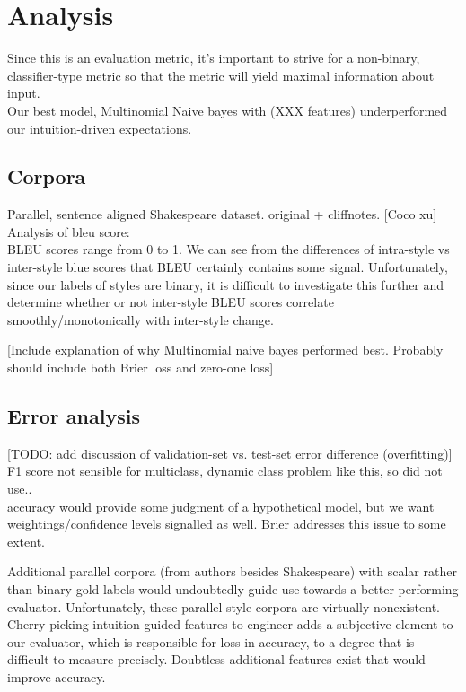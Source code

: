 \documentclass[letterpaper, 10 pt, conference]{ieeeconf}  %
\begin{document}
  \section{Analysis}
    Since this is an evaluation metric, it's important to strive for a non-binary, classifier-type metric so that the metric will yield maximal information about input.\\
    Our best model, Multinomial Naive bayes with (XXX features) underperformed our intuition-driven expectations.

  \subsection{Corpora}
    Parallel, sentence aligned Shakespeare dataset. original + cliffnotes. [Coco xu]
    Analysis of bleu score:\\


  BLEU scores range from 0 to 1. We can see from the differences of intra-style vs inter-style blue scores that BLEU certainly contains some signal. Unfortunately, since our labels of styles are binary, it is difficult to investigate this further and determine whether or not inter-style BLEU scores correlate smoothly/monotonically with inter-style change.

  [Include explanation of why Multinomial naive bayes performed best. Probably should include both Brier loss and zero-one loss]

  \subsection{Error analysis}
      [TODO: add discussion of validation-set vs. test-set error difference (overfitting)]
      F1 score not sensible for multiclass, dynamic class problem like this, so did not use..\\
      accuracy would provide some judgment of a hypothetical model, but we want weightings/confidence levels signalled as well. Brier addresses this issue to some extent.

      Additional parallel corpora (from authors besides Shakespeare) with scalar rather than binary gold labels would undoubtedly guide use towards a better performing evaluator. Unfortunately, these parallel style corpora are virtually nonexistent.
      \\
      Cherry-picking intuition-guided features to engineer adds a subjective element to our evaluator, which is responsible for loss in accuracy, to a degree that is difficult to measure precisely. Doubtless additional features exist that would improve accuracy.
\end{document}
